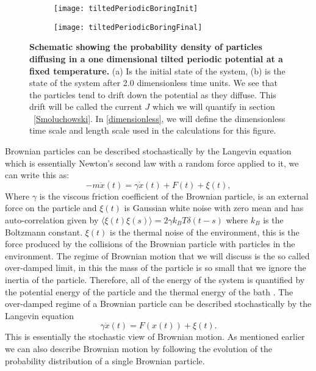 \begin{figure}[tb]
	\begin{subfigure}{0.49\textwidth}
		\texttt{[image: tiltedPeriodicBoringInit]}
		\caption{\label{fig:Init}}
	\end{subfigure}
\begin{subfigure}{0.49\textwidth}
		\texttt{[image: tiltedPeriodicBoringFinal]}
		\caption{\label{fig:Final}}
\end{subfigure}
\caption{\textbf{Schematic showing the probability density of particles diffusing in a one dimensional tilted periodic potential at a fixed temperature.} (a) Is the initial state of the system, (b) is the state of the system after 2.0 dimensionless time units. We see that the particles tend to drift down the potential as they diffuse. This drift will be called the current $J$ which we will quantify in section ~\autoref{Smoluchowski}. In \autoref{dimensionless}, we will define the dimensionless time scale and length scale used in the calculations for this figure.}
\label{fig:Schematic}
\end{figure}

Brownian particles can be described stochastically by the Langevin equation which is essentially Newton's second law with a random force applied to it, we can write this as:
\begin{equation}
-m \ddot{x}(t) = \gamma \dot{x} (t) + F(t) + \xi(t), 
\end{equation}
Where $\gamma$ is the viscous friction coefficient of the Brownian particle, is an external force on the particle and $\xi(t)$ is Gaussian white noise with zero mean and has auto-correlation given by $\langle \xi(t) \xi(s) \rangle = 2 \gamma k_B T \delta(t - s)$ where $k_B$ is the Boltzmann constant. $\xi(t)$ is the thermal noise of the environment, this is the force produced by the collisions of the Brownian particle with particles in the environment.
The regime of Brownian motion that we will discuss is the so called over-damped limit, in this the mass of the particle is so small that we ignore the inertia of the particle. Therefore, all of the energy of the system is quantified by the potential energy of the particle and the thermal energy of the bath \cite{Streater1997,Streater1997a,Streater2000,Streater1997b}. The over-damped regime of a Brownian particle can be described stochastically by the Langevin equation 
\begin{equation}
	\gamma \dot x(t) = F(x(t)) + \xi(t).  \label{eqn:langevin}
\end{equation}
This is essentially the stochastic view of Brownian motion. As mentioned earlier we can also describe Brownian motion by following the evolution of the probability distribution of a single Brownian particle.

